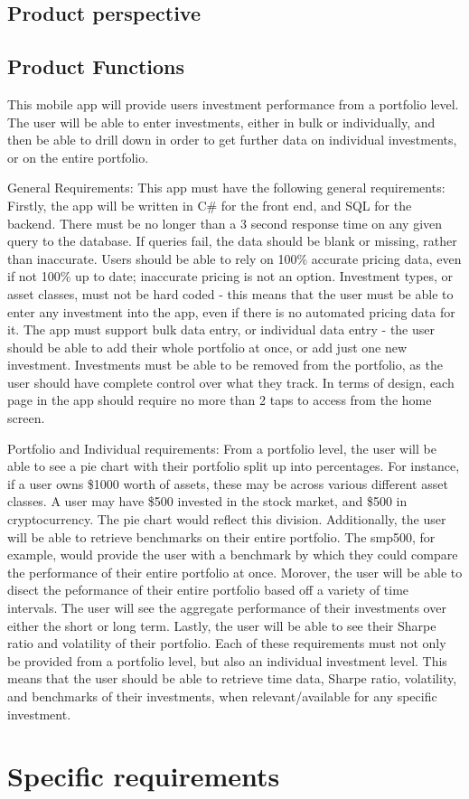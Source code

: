 \documentclass[onecolumn, draftclsnofoot,10pt, compsoc]{IEEEtran}
\begin{document}
\subsection{Product perspective}

\subsection{Product Functions}
This mobile app will provide users investment performance from a portfolio level. The user will be able to enter investments, either in bulk or individually, and then be able to drill down in order to get further data on individual investments, or on the entire portfolio.

General Requirements:
This app must have the following general requirements: Firstly, the app will be written in C\# for the front end, and SQL for the backend. There must be no longer than a 3 second response time on any given query to the database. If queries fail, the data should be blank or missing, rather than inaccurate. Users should be able to rely on 100\% accurate pricing data, even if not 100\% up to date; inaccurate pricing is not an option. Investment types, or asset classes, must not be hard coded - this means that the user must be able to enter any investment into the app, even if there is no automated pricing data for it. The app must support bulk data entry, or individual data entry - the user should be able to add their whole portfolio at once, or add just one new investment. Investments must be able to be removed from the portfolio, as the user should have complete control over what they track. In terms of design, each page in the app should require no more than 2 taps to access from the home screen.

Portfolio and Individual requirements: From a portfolio level, the user will be able to see a pie chart with their portfolio split up into percentages. For instance, if a user owns \$1000 worth of assets, these may be across various different asset classes. A user may have \$500 invested in the stock market, and \$500 in cryptocurrency. The pie chart would reflect this division. Additionally, the user will be able to retrieve benchmarks on their entire portfolio. The smp500, for example, would provide the user with a benchmark by which they could compare the performance of their entire portfolio at once. Morover, the user will be able to disect the peformance of their entire portfolio based off a variety of time intervals. The user will see the aggregate performance of their investments over either the short or long term. Lastly, the user will be able to see their Sharpe ratio and volatility of their portfolio. Each of these requirements must not only be provided from a portfolio level, but also an individual investment level. This means that the user should be able to retrieve time data, Sharpe ratio, volatility, and benchmarks of their investments, when relevant/available for any specific investment.






\section{Specific requirements}
\end{document}

